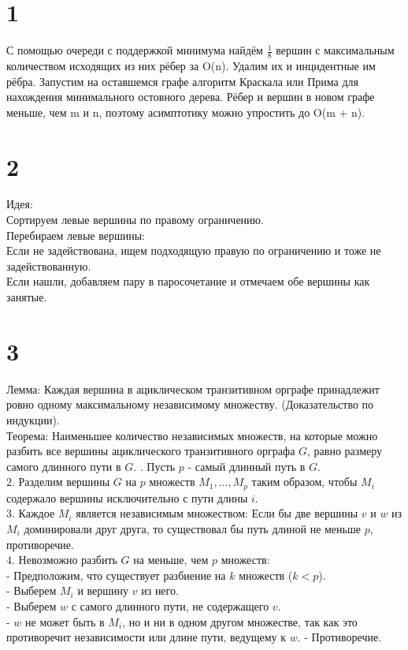 \documentclass[12pt]{extarticle}
\begin{document}
\section*{1}
С помощью очереди с поддержкой минимума найдём $\frac{1}{8}$ вершин с максимальным количеством исходящих из них рёбер за O(n). Удалим их и инцидентные им рёбра. Запустим на оставшемся графе алгоритм Краскала или Прима для нахождения минимального остовного дерева. Рёбер и вершин в новом графе меньше, чем m и n, поэтому асимптотику можно упростить до O(m + n).

\section*{2}
Идея:\\
Сортируем левые вершины по правому ограничению.\\
Перебираем левые вершины:\\
Если не задействована, ищем подходящую правую по ограничению и тоже не задействованную.\\
Если нашли, добавляем пару в паросочетание и отмечаем обе вершины как занятые.

\section*{3}
Лемма: Каждая вершина в ациклическом транзитивном орграфе принадлежит ровно одному максимальному независимому множеству. (Доказательство по индукции).\\
Теорема: Наименьшее количество независимых множеств, на которые можно разбить все вершины ациклического транзитивного орграфа $G$, равно размеру самого длинного пути в $G$.
. Пусть $p$ - самый длинный путь в $G$.\\
2. Разделим вершины $G$ на $p$ множеств $M_1, \dots, M_p$ таким образом, чтобы $M_i$ содержало вершины исключительно с пути длины $i$.\\
3. Каждое $M_i$ является независимым множеством: Если бы две вершины $v$ и $w$ из $M_i$ доминировали друг друга, то существовал бы путь длиной не меньше $p$, противоречие.\\
4. Невозможно разбить $G$ на меньше, чем $p$ множеств:\\
- Предположим, что существует разбиение на $k$ множеств ($k < p$). \\
- Выберем $M_i$ и вершину $v$ из него. \\
- Выберем $w$ с самого длинного пути, не содержащего $v$. \\
- $w$ не может быть в $M_i$, но и ни в одном другом множестве, так как это противоречит независимости или длине пути, ведущему к $w$. - Противоречие.\\
\end{document}
